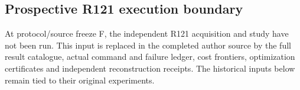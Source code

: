 \subsection{Prospective R121 execution boundary}
At protocol/source freeze F, the independent R121 acquisition and study have
not been run. This input is replaced in the completed author source by the
full result catalogue, actual command and failure ledger, cost frontiers,
optimization certificates and independent reconstruction receipts. The
historical inputs below remain tied to their original experiments.

